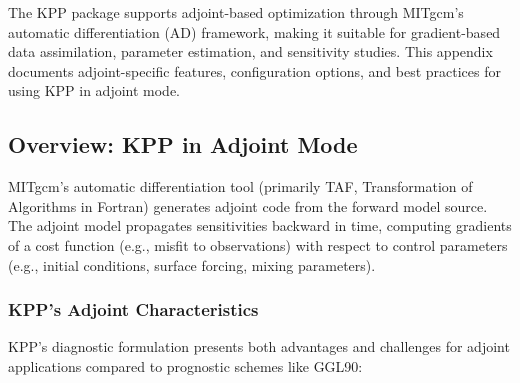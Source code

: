 \documentclass[12pt,letterpaper]{article}
\begin{document}
The KPP package supports adjoint-based optimization through MITgcm's automatic
differentiation (AD) framework, making it suitable for gradient-based data
assimilation, parameter estimation, and sensitivity studies. This appendix
documents adjoint-specific features, configuration options, and best practices
for using KPP in adjoint mode.

\subsection{Overview: KPP in Adjoint Mode}

MITgcm's automatic differentiation tool (primarily TAF, Transformation of
Algorithms in Fortran) generates adjoint code from the forward model source.
The adjoint model propagates sensitivities backward in time, computing gradients
of a cost function (e.g., misfit to observations) with respect to control
parameters (e.g., initial conditions, surface forcing, mixing parameters).

\subsubsection{KPP's Adjoint Characteristics}

KPP's diagnostic formulation presents both advantages and challenges for adjoint
applications compared to prognostic schemes like GGL90:
\end{document}
